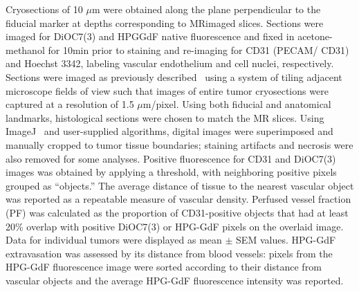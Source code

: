 Cryosections of 10 $\mu$m were obtained along the plane perpendicular to the fiducial marker at depths corresponding to MRimaged slices.
Sections were imaged for DiOC7(3) and HPGGdF native fluorescence and fixed in acetone-methanol for 10min prior to staining and re-imaging for CD31 (PECAM/ CD31) and Hoechst 3342, labeling vascular endothelium and cell nuclei, respectively.
Sections were imaged as previously described~\cite{Kyle:2007ch} using a system of tiling adjacent microscope fields of view such that images of entire tumor cryosections were captured at a resolution of 1.5 $\mu$m/pixel.
Using both fiducial and anatomical landmarks, histological sections were chosen to match the MR slices.
Using ImageJ~\cite{Collins:2007jr} and user-supplied algorithms, digital images were superimposed and manually cropped to tumor tissue boundaries; staining artifacts and necrosis were also removed for some analyses.
Positive fluorescence for CD31 and DiOC7(3) images was obtained by applying a threshold, with neighboring positive pixels grouped as “objects.” The average distance of tissue to the nearest vascular object was reported as a repeatable measure of vascular density.
Perfused vessel fraction (PF) was calculated as the proportion of CD31-positive objects that had at least 20\% overlap with positive DiOC7(3) or HPG-GdF pixels on the overlaid image.
Data for individual tumors were displayed as mean $\pm$ SEM values.
HPG-GdF extravasation was assessed by its distance from blood vessels: pixels from the HPG-GdF fluorescence image were sorted according to their distance from vascular objects and the average HPG-GdF fluorescence intensity was reported.

